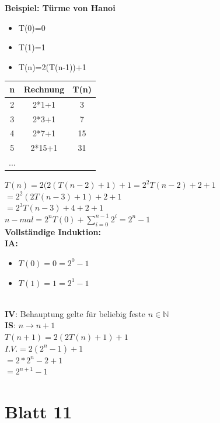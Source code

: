 \documentclass[paper=a4, fontsize=11pt]{scrartcl}
\numberwithin{equation}{section}
\numberwithin{figure}{section}
\numberwithin{table}{section}
\begin{document}
\textbf{Beispiel: Türme von Hanoi} \\
\begin{itemize}
\item T(0)=0
\item T(1)=1
\item T(n)=2(T(n-1))+1
\end{itemize}

\begin{tabular}{|c|c|c|}
\hline
n & Rechnung & T(n) \\\hline
2 & 2*1+1 & 3 \\\hline
3 & 2*3+1 & 7 \\\hline
4 & 2*7+1 & 15 \\\hline
5 & 2*15+1 & 31 \\\hline
... & & \\\hline
\end{tabular}

$T(n)=2(2(T(n-2)+1)+1=2^{2}T(n-2)+2+1$ \\ 
$=2^{2}(2T(n-3)+1)+2+1$ \\
$=2^{3}T(n-3)+4+2+1$ \\
$n-mal = 2^{n}T(0)+\sum^{n-1}_{i=0} 2^{i} = 2^{n}-1$ \\

\textbf{Vollständige Induktion:} \\

\textbf{IA:}
\begin{itemize}
\item $T(0)=0=2^{0}-1$
\item $T(1)=1=2^{1}-1$
\end{itemize} \\

\textbf{IV}: Behauptung gelte für beliebig feste $n \in \mathbb{N}$ \\

\textbf{IS}: $n \rightarrow n+1$ \\
$T(n+1)=2(2T(n)+1)+1$ \\
$I.V. = 2(2^{n}-1)+1$ \\
$=2*2^{n}-2+1$ \\
$=2^{n+1}-1$ \\

\newpage
\section{Blatt 11}
\end{document}
